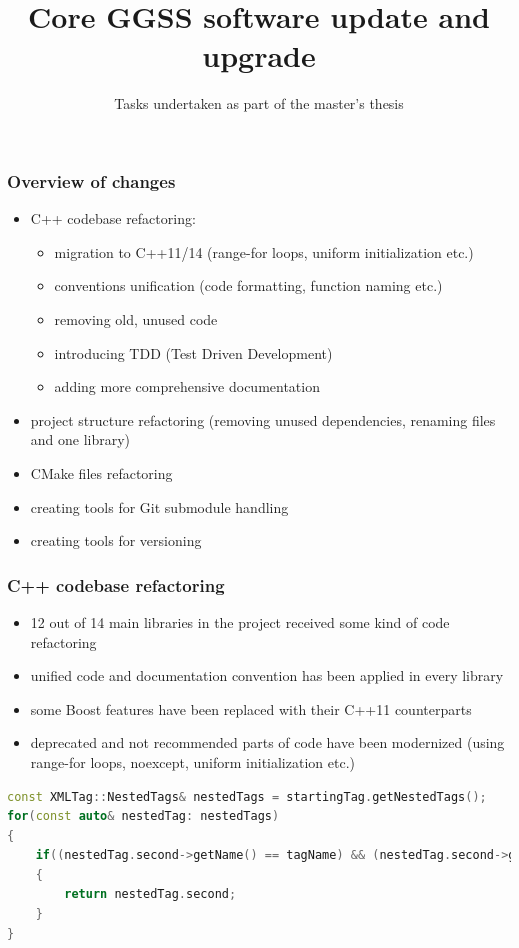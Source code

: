 \documentclass[10pt]{beamer}
\title{Core GGSS software update and upgrade}
\subtitle{\normalsize{Tasks undertaken as part of the master's thesis}}
\author{\normalsize{Arkadiusz Kasprzak \newline \and 
    Jarosław Cierpich \newline \newline \and 
    Supervisor: Bartosz Mindur}}
\date{}
\begin{document}
\titleframe[en]


\begin{frame}
\frametitle{Overview of changes}
\begin{itemize}
    \item C++ codebase refactoring: \begin{itemize}
        \item migration to C++11/14 (range-for loops, uniform initialization etc.)
        \item conventions unification (code formatting, function naming etc.)
        \item removing old, unused code
        \item introducing TDD (Test Driven Development)
        \item adding more comprehensive documentation
    \end{itemize}
    \item project structure refactoring (removing unused dependencies, renaming files and one library)
    \item CMake files refactoring
    \item creating tools for Git submodule handling
    \item creating tools for versioning 
\end{itemize}
\end{frame}


\begin{frame}[fragile]
\frametitle{C++ codebase refactoring}
\begin{itemize}
    \item 12 out of 14 main libraries in the project received some kind of code refactoring
    \item unified code and documentation convention has been applied in every library
    \item some Boost features have been replaced with their C++11 counterparts
    \item deprecated and not recommended parts of code have been modernized (using range-for loops, noexcept, uniform initialization etc.)
\end{itemize}
\begin{lstlisting}[language=c++, caption={Example of new C++ code (after refactoring).}]
const XMLTag::NestedTags& nestedTags = startingTag.getNestedTags();
for(const auto& nestedTag: nestedTags)
{
    if((nestedTag.second->getName() == tagName) && (nestedTag.second->getAttributeValue("id") == idValue))
    {
        return nestedTag.second;
    }
}
\end{lstlisting}
\end{frame}
\end{document}
